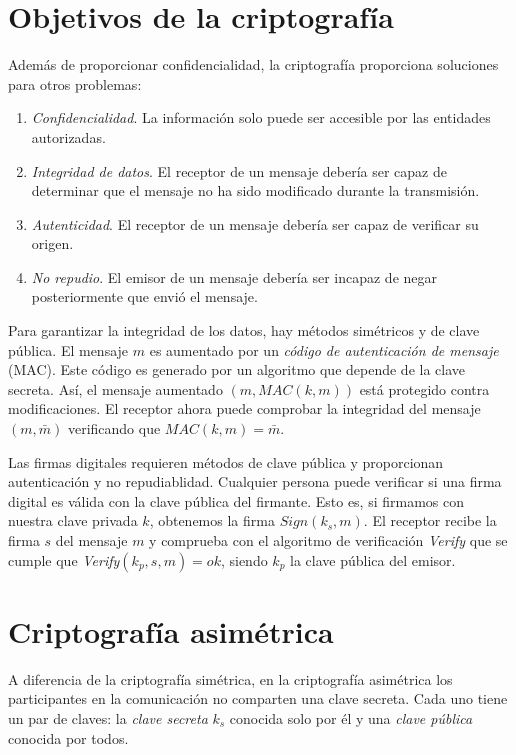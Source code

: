 \section{Objetivos de la criptografía}

Además de proporcionar confidencialidad, la criptografía proporciona soluciones para otros problemas:

\begin{enumerate}
    \item \emph{Confidencialidad}. La información solo puede ser accesible por las entidades autorizadas.
    \item \emph{Integridad de datos}. El receptor de un mensaje debería ser capaz de determinar que el mensaje no ha sido modificado durante la transmisión.
    \item \emph{Autenticidad}. El receptor de un mensaje debería ser capaz de verificar su origen.
    \item \emph{No repudio}. El emisor de un mensaje debería ser incapaz de negar posteriormente que envió el mensaje.
\end{enumerate}

Para garantizar la integridad de los datos, hay métodos simétricos y de clave pública. El mensaje $m$ es aumentado por un \emph{código de autenticación de mensaje} (MAC). Este código es generado por un algoritmo que depende de la clave secreta. Así, el mensaje aumentado $(m, MAC(k,m))$ está protegido contra modificaciones. El receptor ahora puede comprobar la integridad del mensaje $(m, \bar{m})$ verificando que $MAC(k, m) = \bar{m}$.

Las firmas digitales requieren métodos de clave pública y proporcionan autenticación y no repudiablidad. Cualquier persona puede verificar si una firma digital es válida con la clave pública del firmante. Esto es, si firmamos con nuestra clave privada $k$, obtenemos la firma $Sign(k_s, m)$. El receptor recibe la firma $s$ del mensaje $m$ y comprueba con el algoritmo de verificación \emph{Verify} que se cumple que \emph{Verify}$(k_p, s, m) = ok$, siendo $k_p$ la clave pública del emisor.

\section{Criptografía asimétrica}

A diferencia de la criptografía simétrica, en la criptografía asimétrica los participantes en la comunicación no comparten una clave secreta. Cada uno tiene un par de claves: la \emph{clave secreta} $k_s$ conocida solo por él y una \emph{clave pública} conocida por todos.

